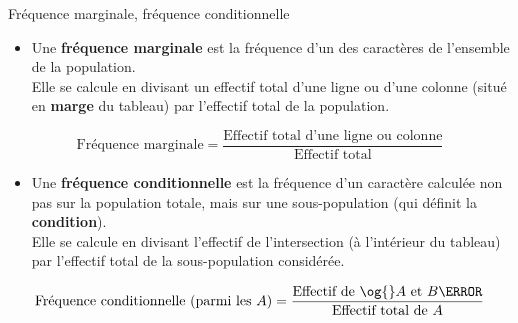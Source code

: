 \begin{defin}{Fréquence marginale, fréquence conditionnelle}
	\begin{itemize}
		\item Une \textbf{fréquence marginale} est la fréquence d'un des caractères de l'ensemble de la population.\\Elle se calcule en divisant un effectif total d'une ligne ou d'une colonne (situé en \textbf{marge} du tableau) par l'effectif total de la population.
	\end{itemize}
	\ms
	$$\text{Fréquence marginale} = \dfrac{\text{Effectif total d'une ligne ou colonne}}{\text{Effectif total}}$$
	\smallskip
	\begin{itemize}
		\item Une \textbf{fréquence conditionnelle} est la fréquence d'un caractère calculée non pas sur la population totale, mais sur une sous-population (qui définit la \textbf{condition}).\\Elle se calcule en divisant l'effectif de l'intersection (à l'intérieur du tableau) par l'effectif total de la sous-population considérée.
	\end{itemize}
	\ms
	$$\text{Fréquence conditionnelle (parmi les } A) = \dfrac{\text{Effectif de \og{}}A\text{ et }B\text{\fg{}}}{\text{Effectif total de } A}$$
\end{defin}

\newpage

